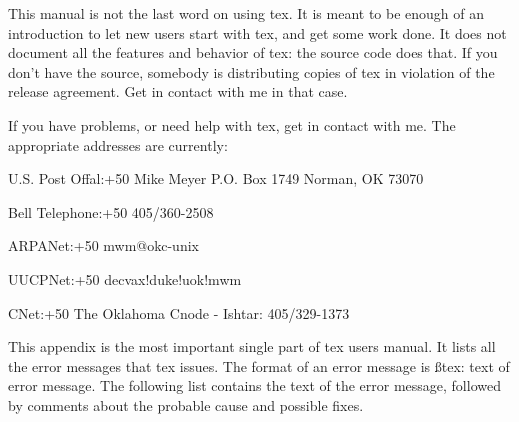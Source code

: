 
This manual is not the last word on using tex. It is meant to be
enough of an introduction to let new users start with tex, and
get some work done. It does not document all the features and
behavior of tex: the source code does that. If you don't have the
source, somebody is distributing copies of tex in violation of
the release agreement. Get in contact with me in that case.

If you have problems, or need help with tex, get in contact with
me. The appropriate addresses are currently:

{
U.S. Post Offal:{\lftmarg +50
Mike Meyer
P.O. Box 1749
Norman, OK 73070}

Bell Telephone:{\lftmarg +50
405/360-2508}

ARPANet:{\lftmarg +50
mwm@okc-unix}

UUCPNet:{\lftmarg +50
decvax!duke!uok!mwm}

CNet:{\lftmarg +50
The Oklahoma Cnode - Ishtar: 405/329-1373}}



This appendix is the most important single part of tex users
manual.  It lists all the error messages that tex issues. The
format of an error message is {\ss tex: text of error message.}
The following list contains the text of the error message,
followed by comments about the probable cause and possible fixes.

